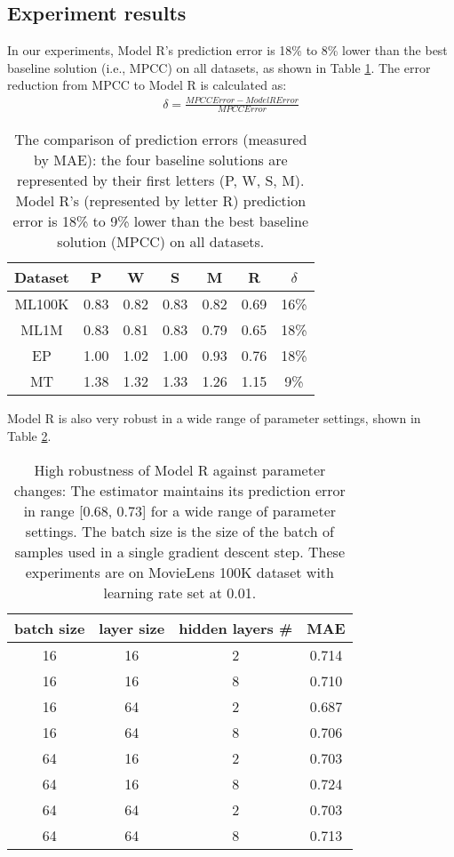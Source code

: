 \documentclass[sigconf]{acmart}
\begin{document}
\subsection{Experiment results}
In our experiments, Model R's prediction error is 18\% to 8\% lower than
the best baseline solution (i.e., MPCC) on all datasets, as shown in Table 
\ref{tab:errors}.
The error reduction from MPCC to Model R is calculated as:
\begin{align*}
	\delta = \frac{MPCCError - ModelRError}{MPCCError}
\end{align*}
\begin{table}[!htb]
	\centering
	\caption{The comparison of prediction errors (measured by MAE): 
		the four baseline solutions are represented by their first letters (P, W, S, M).
		Model R's (represented by letter R) prediction error is 18\% to 9\% 
		lower than the best baseline 
		solution (MPCC) on all datasets.
		}
	\begin{tabular}{ccccccc} \hline
		Dataset & P    & W    & S    & M    & R    & $ \delta $ \\ \hline
		ML100K  & 0.83 & 0.82 & 0.83 & 0.82 & 0.69 & 16\% \\ \hline
		ML1M    & 0.83 & 0.81 & 0.83 & 0.79 & 0.65 & 18\% \\ \hline
		EP      & 1.00 & 1.02 & 1.00 & 0.93 & 0.76 & 18\% \\ \hline
		MT      & 1.38 & 1.32 & 1.33 & 1.26 & 1.15 & 9\%  \\ \hline
	\end{tabular}
	\label{tab:errors}
\end{table}
Model R is also very robust in a wide range of parameter settings, shown in 
Table \ref{tab:robust}.
\begin{table}[!htb]
	\centering
	\caption{High robustness of Model R against parameter changes:
		The estimator maintains its prediction error in range [0.68, 0.73] for 
		a wide range of parameter settings. The batch size is the size of the 
		batch of samples used in a single gradient descent step.
		These experiments are on MovieLens 100K dataset with learning rate set 
		at 0.01.
	}
	\begin{tabular}{cccc}  \hline
		 batch size & layer size & hidden layers \# & MAE \\ \hline
		 16 & 16 & 2 & 0.714 \\ \hline
		 16 & 16 & 8 & 0.710 \\ \hline
		 16 & 64 & 2 & 0.687 \\ \hline
		 16 & 64 & 8 & 0.706 \\ \hline
		 64 & 16 & 2 & 0.703 \\ \hline
		 64 & 16 & 8 & 0.724 \\ \hline
		 64 & 64 & 2 & 0.703 \\ \hline
		 64 & 64 & 8 & 0.713 \\ \hline
	\end{tabular}
	\label{tab:robust}
\end{table}
\end{document}
